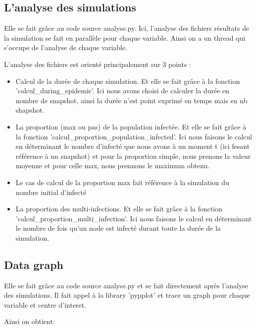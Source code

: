 \documentclass[a4paper, 11pt]{article}
\begin{document}
		\subsection{L'analyse des simulations}

			Elle se fait grâce au code source analyse.py. Ici, l'analyse des fichiers résultats de la simulation se fait en parallèle pour chaque variable. Ainsi on a un thread qui s'occupe de l'analyse de chaque variable.

			L'analyse des fichiers est orienté principalement sur 3 points :
			\begin{itemize}
				\item Calcul de la durée de chaque simulation. Et elle se fait grâce à la fonction 'calcul\_during\_epidemic'.
				Ici nous avons choisi de calculer la durée en nombre de snapshot, ainsi la durée n'est point exprimé en temps mais en nb shapshot.
				\item La proportion (max ou pas) de la population infectée. Et elle se fait grâce à la fonction 'calcul\_proportion\_population\_infected'.
				Ici nous faisons le calcul en déterminant le nombre d'infecté que nous avons à un moment t (ici fesant référence à un snapshot)
				et pour la proportion simple, nous prenons la valeur moyenne et pour celle max, nous prennons le maximum obtenu.
				\item Le cas de calcul de la proportion max fait référence à la simulation du nombre initial d'infecté
				\item La proportion des multi-infections. Et elle se fait grâce à la fonction 'calcul\_proportion\_multi\_infection'.
				Ici nous faisons le calcul en déterminant le nombre de fois qu'un node est infecté durant toute la durée de la simulation.
			\end{itemize}


		\subsection{Data graph}

			Elle se fait grâce au code source analyse.py et se fait directement après l'analyse des simulations. Il fait appel à la library 'pypplot' et trace un graph pour chaque variable et centre d'interet.
			
			Ainsi on obtient:
			\newpage
			
\end{document}
